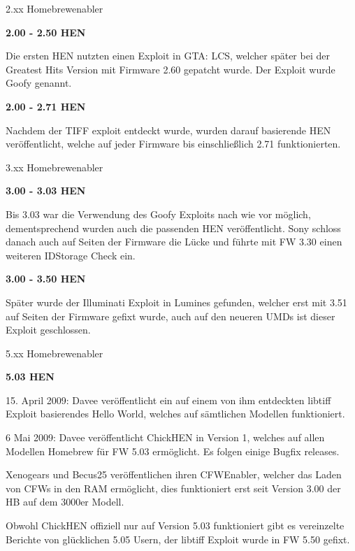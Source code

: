 \documentclass[mode=print,paper=screen,size=10pt,style=paintings]{powerdot}
\newcommand{\Anf}[1]{\glqq #1\grqq}
\begin{document}
\begin{slide}{2.xx Homebrewenabler}
	\begin{large}\textbf{2.00 - 2.50 HEN}\end{large}\linebreak
	Die ersten HEN nutzten einen Exploit in GTA: LCS, welcher später bei der \Anf{Greatest Hits} Version mit Firmware 2.60
	gepatcht wurde. Der Exploit wurde \Anf{Goofy} genannt.\linebreak
	\linebreak
	\begin{large}\textbf{2.00 - 2.71 HEN}\end{large}\linebreak
	Nachdem der TIFF exploit entdeckt wurde, wurden darauf basierende HEN veröffentlicht, welche auf jeder Firmware bis
	einschließlich 2.71 funktionierten.	
\end{slide}

\begin{slide}{3.xx Homebrewenabler}
	\begin{large}\textbf{3.00 - 3.03 HEN}\end{large}\linebreak
	Bis 3.03 war die Verwendung des Goofy Exploits nach wie vor möglich, dementsprechend wurden auch die passenden HEN
	veröffentlicht. Sony schloss danach auch auf Seiten der Firmware die Lücke und führte mit FW 3.30 einen weiteren
	IDStorage Check ein.\linebreak
	\linebreak
	\begin{large}\textbf{3.00 - 3.50 HEN}\end{large}\linebreak
	Später wurde der \Anf{Illuminati} Exploit in Lumines gefunden, welcher erst mit 3.51 auf Seiten der Firmware gefixt wurde,
	auch auf den neueren UMDs ist dieser Exploit geschlossen.	
\end{slide}

\begin{slide}{5.xx Homebrewenabler}
	\begin{large}\textbf{5.03 HEN}\end{large}
	\begin{list}{-}{}
		\item{15. April 2009: Davee veröffentlicht ein auf einem von ihm entdeckten libtiff Exploit basierendes Hello World, 
			welches auf sämtlichen Modellen funktioniert.}
		\item{6 Mai 2009: Davee veröffentlicht ChickHEN in Version 1, welches auf allen Modellen Homebrew für FW 5.03 
			ermöglicht. Es folgen einige Bugfix releases.}
		\item{Xenogears und Becus25 veröffentlichen ihren CFWEnabler, welcher das Laden von CFWs in den RAM ermöglicht,
			dies funktioniert erst seit Version 3.00 der HB auf dem 3000er Modell.}
		\item{Obwohl ChickHEN offiziell nur auf Version 5.03 funktioniert gibt es vereinzelte Berichte von glücklichen 5.05
			Usern, der libtiff Exploit wurde in FW 5.50 gefixt.} 
	\end{list}	
\end{slide}
\end{document}
